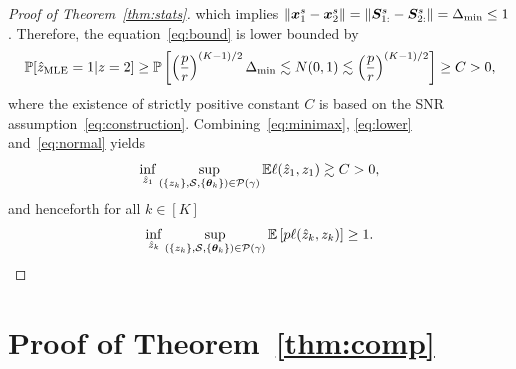 \documentclass[lettersize,onecolumn,journal]{IEEEtran}
\theoremstyle{definition}
\theoremstyle{definition}
\begin{document}
\begin{proof}[Proof of Theorem~\ref{thm:stats}]
which implies $\lVert\bm x^s_1-\bm x^s_2\rVert = \lVert\bm S_{1:}^s-\bm S_{2:}^s\rVert = \Delta_{\min} \leq 1$. Therefore, the equation~\eqref{eq:bound} is lower bounded by
\begin{equation}\label{eq:normal}
\bbP[\hat z_{\text{MLE}}=1|z=2] \geq \bbP\left[ \left({p\over r}\right)^{(K-1)/2}\Delta_{\min}\lesssim N(0,1)\lesssim  \left({p\over r}\right)^{(K-1)/2} \right]\geq C>0,
\end{equation}
 where the existence of strictly positive constant $C$ is based on the SNR assumption~\eqref{eq:construction}. Combining~\eqref{eq:minimax}, \eqref{eq:lower} and~\eqref{eq:normal} yields
\[
\inf_{\hat z_1}\sup_{(\{z_k\},\mathcal{S},\{\boldsymbol{\theta}_k\})\in \mathcal{P}(\gamma)}\mathbb{E}\ell(\hat z_1, z_1)\gtrsim C>0, 
\]
and henceforth for all $k \in [K]$
\[
\inf_{\hat z_k}\sup_{(\{z_k\},\mathcal{S},\{\boldsymbol{\theta}_k\})\in \mathcal{P}(\gamma)}\mathbb{E} \left[p\ell(\hat z_k, z_k)\right]\geq 1.
\]

\end{proof}



\section*{Proof of Theorem~\ref{thm:comp}}
\end{document}
